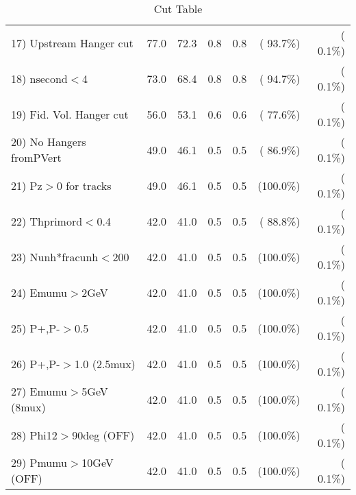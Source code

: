\begin{table}[h!]
\begin{tabular}{||l||r|r|r|r|r|r||}
 17) Upstream Hanger cut  &         77.0 &         72.3 &          0.8 &          0.8 & ( 93.7\%) & (  0.1\%) \\
 18) nsecond$<$4          &         73.0 &         68.4 &          0.8 &          0.8 & ( 94.7\%) & (  0.1\%) \\
 19) Fid. Vol. Hanger cut &         56.0 &         53.1 &          0.6 &          0.6 & ( 77.6\%) & (  0.1\%) \\
 20) No Hangers fromPVert &         49.0 &         46.1 &          0.5 &          0.5 & ( 86.9\%) & (  0.1\%) \\
 21) Pz$>$0 for tracks    &         49.0 &         46.1 &          0.5 &          0.5 & (100.0\%) & (  0.1\%) \\
 22) Thprimord$<$0.4      &         42.0 &         41.0 &          0.5 &          0.5 & ( 88.8\%) & (  0.1\%) \\
 23) Nunh*fracunh$<$200   &         42.0 &         41.0 &          0.5 &          0.5 & (100.0\%) & (  0.1\%) \\
 24) Emumu$>$2GeV         &         42.0 &         41.0 &          0.5 &          0.5 & (100.0\%) & (  0.1\%) \\
 25) P+,P-$>$0.5          &         42.0 &         41.0 &          0.5 &          0.5 & (100.0\%) & (  0.1\%) \\
 26) P+,P-$>$1.0 (2.5mux) &         42.0 &         41.0 &          0.5 &          0.5 & (100.0\%) & (  0.1\%) \\
 27) Emumu$>$5GeV  (8mux) &         42.0 &         41.0 &          0.5 &          0.5 & (100.0\%) & (  0.1\%) \\
 28) Phi12$>$90deg  (OFF) &         42.0 &         41.0 &          0.5 &          0.5 & (100.0\%) & (  0.1\%) \\
 29) Pmumu$>$10GeV  (OFF) &         42.0 &         41.0 &          0.5 &          0.5 & (100.0\%) & (  0.1\%) \\
 \hline
 \hline
 \end{tabular}
 \caption{Cut Table           }
 \label{tab-cutcohjpsi-mumu_anuecc}
 \end{table}
